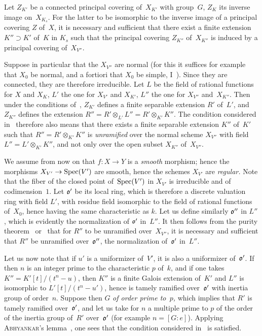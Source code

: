 \begin{lemma}
\label{X.3.7}
Let $Z_{K'}$ be a connected principal covering of~$X_{K'}$ with
group~$G$, $Z_{K}$ its inverse image on~$X_{K_s}$\quoi. For the
latter to be isomorphic to the inverse image of a
principal covering $Z$ of~$X$, it is necessary and sufficient that there exist a
finite extension $K''\supset K'$ of~$K$ in $K_s$ such that the
principal covering $Z_{K''}$ of~$X_{K''}$ is induced by a
principal covering of~$X_{V''}$.
\end{lemma}

Suppose in particular that the $X_{V''}$ are normal (for this it
suffices for example that $X_0$ be normal, and a fortiori that $X_0$
be simple, \cf I~).
Since they are connected, they are therefore irreducible. Let $L$ be the
field of rational functions for $X$ and $X_{K}$, $L'$ the one for
$X_{V'}$ and $X_{K'}$, $L''$ the one for $X_{V''}$ and~$X_{K''}$\quoi. Then
under the conditions of~, $Z_{K'}$ defines a finite
separable extension $R'$ of~$L'$, and $Z_{K''}$ defines the extension
$R''=R'\otimes_{L'} L'' = R'\otimes_{K'} K''$. The condition
considered in~ therefore also means that there exists a
finite separable extension $K''$ of~$K'$ such that
$R''=R'\otimes_{K'} K''$ is \emph{unramified} over the
normal scheme $X_{V''}$ with field $L''=L'\otimes_{K'} K''$, and not
only over the open subset $X_{K''}$ of~$X_{V''}$.

We assume from now on that $f\colon X\to Y$ is a
\emph{smooth} morphism; hence the morphisms $X_{V'}\to \Spec(V')$ are smooth,
hence the schemes $X_{V'}$ are \emph{regular.} Note that the
fiber of the closed point of~$\operatorname{Spec}(V')$ in $X_{V'}$ is
irreducible and of codimension~$1$. Let $\mathfrak{o'}$ be its local
ring, which is therefore a discrete valuation ring with field
$L'$, with residue field isomorphic to the field of rational
functions of~$X_0$, hence having the same characteristic as
$k$. Let us define similarly $\mathfrak{o''}$ in $L''$, which is
evidently the normalization of
$\mathfrak{o'}$
in~$L''$. It
then follows from the purity theorem~
or~ that for $R''$ to be unramified over~$X_{V''}$,
it is necessary and sufficient that $R''$ be unramified over~$\mathfrak{o''}$,
the normalization of~$\mathfrak{o'}$ in~$L''$.

Let us now note that if $u'$ is a uniformizer of~$V'$, it is
also a uniformizer of~$\mathfrak{o'}$. If then $n$ is an integer
prime to the characteristic $p$ of~$k$, and if one takes
$K''=K'[t]/(t^n-u)$, then
$K''$
is a finite Galois extension
of~$K'$ and $L''$ is isomorphic to $L'[t]/(t^n-u')$, hence is
tamely ramified over~$\mathfrak{o'}$ with inertia group
of order~$n$. Suppose then $G$ \emph{of order prime to~$p$,} which
implies that $R'$ is tamely ramified over~$\mathfrak{o'}$, and let us take for $n$ a multiple prime to $p$ of
the order of the inertia group of~$R'$ over~$\mathfrak{o'}$ (for example
$n=[G\colon e]$). Applying
\textsc{Abhyankar}'s lemma~, one
sees that the condition considered in~ is
satisfied.

